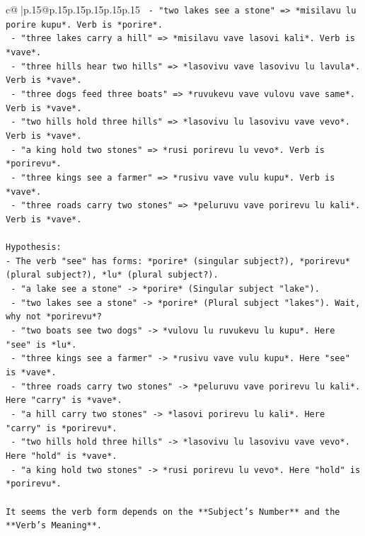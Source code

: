 \documentclass{article}
\begin{document}
{\begin{supertabular}{c@{$\;$}|p{.15\linewidth}@{}p{.15\linewidth}p{.15\linewidth}p{.15\linewidth}p{.15\linewidth}p{.15\linewidth}}
{{{\texttt{        {-} "two lakes see a stone" => *misilavu lu porire kupu*. Verb is *porire*.} \\
\texttt{        {-} "three lakes carry a hill" => *misilavu vave lasovi kali*. Verb is *vave*.} \\
\texttt{        {-} "three hills hear two hills" => *lasovivu vave lasovivu lu lavula*. Verb is *vave*.} \\
\texttt{        {-} "three dogs feed three boats" => *ruvukevu vave vulovu vave same*. Verb is *vave*.} \\
\texttt{        {-} "two hills hold three hills" => *lasovivu lu lasovivu vave vevo*. Verb is *vave*.} \\
\texttt{        {-} "a king hold two stones" => *rusi porirevu lu vevo*. Verb is *porirevu*.} \\
\texttt{        {-} "three kings see a farmer" => *rusivu vave vulu kupu*. Verb is *vave*.} \\
\texttt{        {-} "three roads carry two stones" => *peluruvu vave porirevu lu kali*. Verb is *vave*.} \\
\\ 
\texttt{Hypothesis:} \\
\texttt{{-} The verb "see" has forms: *porire* (singular subject?), *porirevu* (plural subject?), *lu* (plural subject?).} \\
\texttt{  {-} "a lake see a stone" {-}> *porire* (Singular subject "lake").} \\
\texttt{  {-} "two lakes see a stone" {-}> *porire* (Plural subject "lakes"). Wait, why not *porirevu*?} \\
\texttt{  {-} "two boats see two dogs" {-}> *vulovu lu ruvukevu lu kupu*. Here "see" is *lu*.} \\
\texttt{  {-} "three kings see a farmer" {-}> *rusivu vave vulu kupu*. Here "see" is *vave*.} \\
\texttt{  {-} "three roads carry two stones" {-}> *peluruvu vave porirevu lu kali*. Here "carry" is *vave*.} \\
\texttt{  {-} "a hill carry two stones" {-}> *lasovi porirevu lu kali*. Here "carry" is *porirevu*.} \\
\texttt{  {-} "two hills hold three hills" {-}> *lasovivu lu lasovivu vave vevo*. Here "hold" is *vave*.} \\
\texttt{  {-} "a king hold two stones" {-}> *rusi porirevu lu vevo*. Here "hold" is *porirevu*.} \\
\\ 
\texttt{It seems the verb form depends on the **Subject's Number** and the **Verb's Meaning**.} \\
}}}
\end{supertabular}}
\end{document}
